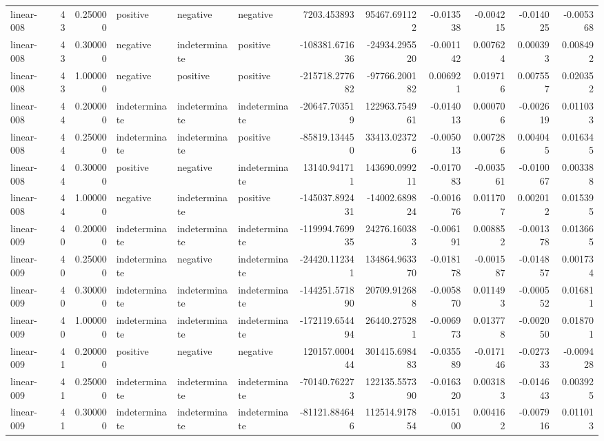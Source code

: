 \begin{tabular}{lrrlllrrrrrr}
linear-008 & 43 & 0.250000 & positive & negative & negative & 7203.453893 & 95467.691122 & -0.013538 & -0.004215 & -0.014025 & -0.005368 \\
linear-008 & 43 & 0.300000 & negative & indeterminate & positive & -108381.671636 & -24934.295520 & -0.001142 & 0.007624 & 0.000393 & 0.008492 \\
linear-008 & 43 & 1.000000 & negative & positive & positive & -215718.277682 & -97766.200182 & 0.006921 & 0.019716 & 0.007557 & 0.020352 \\
linear-008 & 44 & 0.200000 & indeterminate & indeterminate & indeterminate & -20647.703519 & 122963.754961 & -0.014013 & 0.000706 & -0.002619 & 0.011033 \\
linear-008 & 44 & 0.250000 & indeterminate & indeterminate & positive & -85819.134450 & 33413.023726 & -0.005013 & 0.007286 & 0.004045 & 0.016345 \\
linear-008 & 44 & 0.300000 & positive & negative & indeterminate & 13140.941711 & 143690.099211 & -0.017083 & -0.003561 & -0.010067 & 0.003388 \\
linear-008 & 44 & 1.000000 & negative & indeterminate & positive & -145037.892431 & -14002.689824 & -0.001676 & 0.011707 & 0.002012 & 0.015395 \\
linear-009 & 40 & 0.200000 & indeterminate & indeterminate & indeterminate & -119994.769935 & 24276.160383 & -0.006191 & 0.008852 & -0.001378 & 0.013665 \\
linear-009 & 40 & 0.250000 & indeterminate & negative & indeterminate & -24420.112341 & 134864.963370 & -0.018178 & -0.001587 & -0.014857 & 0.001734 \\
linear-009 & 40 & 0.300000 & indeterminate & indeterminate & indeterminate & -144251.571890 & 20709.912688 & -0.005870 & 0.011493 & -0.000552 & 0.016811 \\
linear-009 & 40 & 1.000000 & indeterminate & indeterminate & indeterminate & -172119.654494 & 26440.275281 & -0.006973 & 0.013778 & -0.002050 & 0.018701 \\
linear-009 & 41 & 0.200000 & positive & negative & negative & 120157.000444 & 301415.698483 & -0.035589 & -0.017146 & -0.027333 & -0.009428 \\
linear-009 & 41 & 0.250000 & indeterminate & indeterminate & indeterminate & -70140.762273 & 122135.557390 & -0.016320 & 0.003183 & -0.014643 & 0.003925 \\
linear-009 & 41 & 0.300000 & indeterminate & indeterminate & indeterminate & -81121.884646 & 112514.917854 & -0.015100 & 0.004162 & -0.007916 & 0.011013 \\

\end{tabular}
